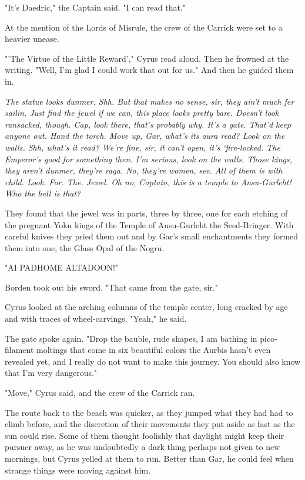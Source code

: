 "It’s Daedric," the Captain said. "I can read that."

At the mention of the Lords of Misrule, the crew of the Carrick were set to a heavier unease.

"’The Virtue of the Little Reward’," Cyrus read aloud. Then he frowned at the writing. "Well, I’m glad I could work that out for us." And then he guided them in.

\parabreak

\textit{The statue looks dunmer. Shh. But that makes no sense, sir, they ain’t much fer sailin. Just find the jewel if we can, this place looks pretty bare. Doesn’t look ransacked, though. Cap, look there, that’s probably why. It’s a gate. That’d keep anyone out. Hand the torch. Move up, Gar, what’s its aura read? Look on the walls. Shh, what’s it read? We’re fine, sir, it can’t open, it’s ‘fire-locked. The Emperor’s good for something then. I’m serious, look on the walls. Those kings, they aren’t dunmer, they’re raga. No, they’re women, see. All of them is with child. Look. For. The. Jewel. Oh no, Captain, this is a temple to Ansu-Gurleht! Who the hell is 
that?}

\parabreak

They found that the jewel was in parts, three by three, one for each etching of the pregnant Yoku kings of the Temple of Ansu-Gurleht the Seed-Bringer. With careful knives they pried them out and by Gar’s small enchantments they formed them into one, the Glass Opal of the Nogru.

"AI PADHOME ALTADOON!"

Borden took out his sword. "That came from the gate, sir."

Cyrus looked at the arching columns of the temple center, long cracked by age and with traces of wheel-carvings. "Yeah," he said.

The gate spoke again. "Drop the bauble, rude shapes, I am bathing in pico-filament moltings that come in six beautiful colors the Aurbis hasn’t even revealed yet, and I really do not want to make this journey. You should also know that I’m very dangerous."

"Move," Cyrus said, and the crew of the Carrick ran.

\parabreak

The route back to the beach was quicker, as they jumped what they had had to climb before, and the discretion of their movements they put aside as fast as the sun could rise. Some of them thought foolishly that daylight might keep their pursuer away, as he was undoubtedly a dark thing perhaps not given to new mornings, but Cyrus yelled at them to run. Better than Gar, he could feel when strange things were moving against him.

